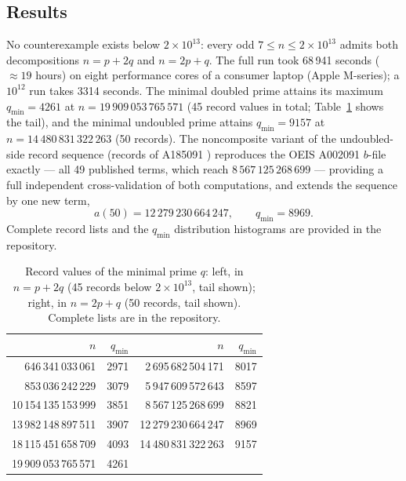 \documentclass[11pt]{article}
\begin{document}
\subsection{Results}
No counterexample exists below $2\times10^{13}$: every odd
$7 \le n \le 2\times10^{13}$ admits both decompositions $n=p+2q$ and
$n=2p+q$. The full run took 68\,941 seconds ($\approx19$ hours) on eight
performance cores of a consumer laptop (Apple M-series); a $10^{12}$ run
takes 3314 seconds. The minimal doubled prime attains its maximum
$q_{\min} = 4261$ at $n = 19\,909\,053\,765\,571$ (45 record values in
total; Table~\ref{tab:records} shows the tail), and the minimal undoubled prime attains
$q_{\min} = 9157$ at $n = 14\,480\,831\,322\,263$ (50 records). The
noncomposite variant of the undoubled-side record sequence (records of
A185091 \cite{oeis185091}) reproduces
the OEIS A002091 $b$-file exactly --- all 49 published terms, which
reach $8\,567\,125\,268\,699$ --- providing a full independent
cross-validation of both computations, and extends the sequence by one
new term,
\[
a(50) = 12\,279\,230\,664\,247, \qquad q_{\min} = 8969.
\] Complete record lists and the $q_{\min}$
distribution histograms are provided in the repository.

\begin{table}[ht]\centering
\caption{Record values of the minimal prime $q$: left, in $n=p+2q$
(45 records below $2\times10^{13}$, tail shown); right, in $n=2p+q$
(50 records, tail shown). Complete lists are in the repository.}
\label{tab:records}
\begin{tabular}{rr@{\qquad}rr}
\toprule
$n$ & $q_{\min}$ & $n$ & $q_{\min}$ \\
\midrule
646\,341\,033\,061 & 2971 & 2\,695\,682\,504\,171 & 8017 \\
853\,036\,242\,229 & 3079 & 5\,947\,609\,572\,643 & 8597 \\
10\,154\,135\,153\,999 & 3851 & 8\,567\,125\,268\,699 & 8821 \\
13\,982\,148\,897\,511 & 3907 & 12\,279\,230\,664\,247 & 8969 \\
18\,115\,451\,658\,709 & 4093 & 14\,480\,831\,322\,263 & 9157 \\
19\,909\,053\,765\,571 & 4261 & & \\
\bottomrule
\end{tabular}
\end{table}
\end{document}
